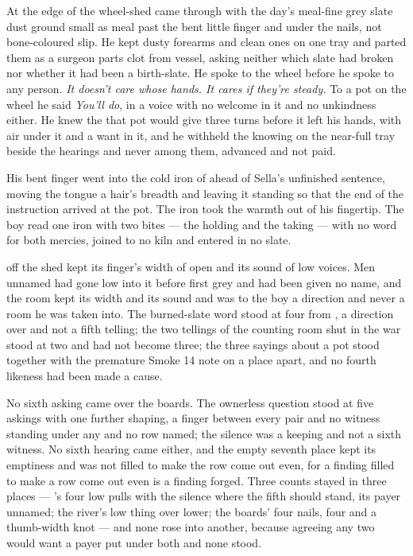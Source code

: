 At the edge of the wheel-shed  came through with the day's meal-fine grey slate dust ground small as meal past the bent little finger and under the nails, not bone-coloured slip. He kept dusty forearms and clean ones on one tray and parted them as a surgeon parts clot from vessel, asking neither which slate had broken nor whether it had been a birth-slate. He spoke to the wheel before he spoke to any person. \emph{It doesn't care whose hands. It cares if they're steady.} To a pot on the wheel he said \emph{You'll do}, in a voice with no welcome in it and no unkindness either. He knew the  that pot would give three turns before it left his hands, with air under it and a want in it, and he withheld the knowing on the near-full tray beside the hearings and never among them, advanced and not paid.

His bent finger went into the cold iron of  ahead of Sella's unfinished sentence, moving the tongue a hair's breadth and leaving it standing so that the end of the instruction arrived at the pot. The iron took the warmth out of his fingertip. The boy read one iron with two bites --- the holding and the taking --- with no  word for both mercies, joined to no kiln and entered in no slate.

 off the shed kept its finger's width of open and its sound of low voices. Men unnamed had gone low into it before first grey and had been given no name, and the room kept its width and its sound and was to the boy a direction and never a room he was taken into. The burned-slate word stood at four from , a direction over  and not a fifth telling; the two tellings of the counting room shut in the war stood at two and had not become three; the three sayings about a pot stood together with the premature Smoke 14 note on a place apart, and no fourth likeness had been made a cause.

No sixth asking came over the boards. The ownerless question stood at five askings with one further shaping, a finger between every pair and no witness standing under any and no row named; the silence was a keeping and not a sixth witness. No sixth hearing came either, and the empty seventh place kept its emptiness and was not filled to make the row come out even, for a finding filled to make a row come out even is a finding forged. Three counts stayed in three places --- 's four low pulls with the silence where the fifth should stand, its payer unnamed; the river's low thing over lower; the boards' four nails, four and a thumb-width knot --- and none rose into another, because agreeing any two would want a payer put under both and none stood.

